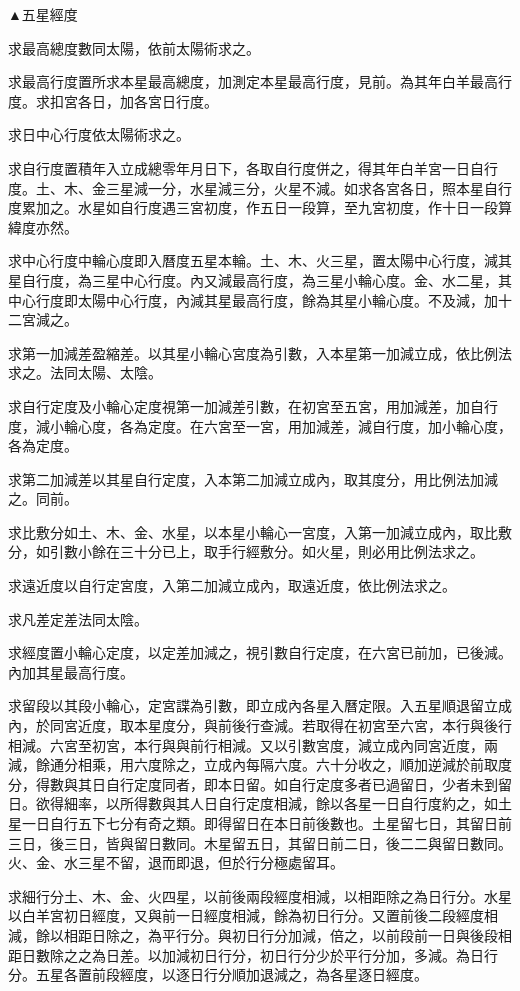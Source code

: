 ▲五星經度

求最高總度數同太陽，依前太陽術求之。

求最高行度置所求本星最高總度，加測定本星最高行度，見前。為其年白羊最高行度。求扣宮各日，加各宮日行度。

求日中心行度依太陽術求之。

求自行度置積年入立成總零年月日下，各取自行度併之，得其年白羊宮一日自行度。土、木、金三星減一分，水星減三分，火星不減。如求各宮各日，照本星自行度累加之。水星如自行度遇三宮初度，作五日一段算，至九宮初度，作十日一段算緯度亦然。

求中心行度中輪心度即入曆度五星本輪。土、木、火三星，置太陽中心行度，減其星自行度，為三星中心行度。內又減最高行度，為三星小輪心度。金、水二星，其中心行度即太陽中心行度，內減其星最高行度，餘為其星小輪心度。不及減，加十二宮減之。

求第一加減差盈縮差。以其星小輪心宮度為引數，入本星第一加減立成，依比例法求之。法同太陽、太陰。

求自行定度及小輪心定度視第一加減差引數，在初宮至五宮，用加減差，加自行度，減小輪心度，各為定度。在六宮至一宮，用加減差，減自行度，加小輪心度，各為定度。

求第二加減差以其星自行定度，入本第二加減立成內，取其度分，用比例法加減之。同前。

求比敷分如土、木、金、水星，以本星小輪心一宮度，入第一加減立成內，取比敷分，如引數小餘在三十分已上，取手行經敷分。如火星，則必用比例法求之。

求遠近度以自行定宮度，入第二加減立成內，取遠近度，依比例法求之。

求凡差定差法同太陰。

求經度置小輪心定度，以定差加減之，視引數自行定度，在六宮已前加，已後減。內加其星最高行度。

求留段以其段小輪心，定宮諜為引數，即立成內各星入曆定限。入五星順退留立成內，於同宮近度，取本星度分，與前後行查減。若取得在初宮至六宮，本行與後行相減。六宮至初宮，本行與與前行相減。又以引數宮度，減立成內同宮近度，兩減，餘通分相乘，用六度除之，立成內每隔六度。六十分收之，順加逆減於前取度分，得數與其日自行定度同者，即本日留。如自行定度多者已過留日，少者未到留日。欲得細率，以所得數與其人日自行定度相減，餘以各星一日自行度約之，如土星一日自行五下七分有奇之類。即得留日在本日前後數也。土星留七日，其留日前三日，後三日，皆與留日數同。木星留五日，其留日前二日，後二二與留日數同。火、金、水三星不留，退而即退，但於行分極處留耳。

求細行分土、木、金、火四星，以前後兩段經度相減，以相距除之為日行分。水星以白羊宮初日經度，又與前一日經度相減，餘為初日行分。又置前後二段經度相減，餘以相距日除之，為平行分。與初日行分加減，倍之，以前段前一日與後段相距日數除之之為日差。以加減初日行分，初日行分少於平行分加，多減。為日行分。五星各置前段經度，以逐日行分順加退減之，為各星逐日經度。

